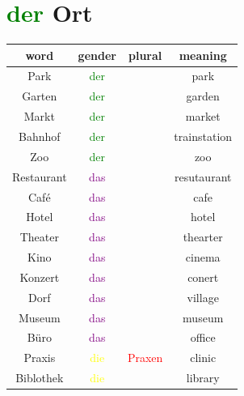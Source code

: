 \section{\textcolor{green}{der} Ort}
\begin{center}
    \begin{tabular}{|c|c|c|c|}
        \hline
        \rowcolor{gray}
        word         & gender                  & plural                  & meaning      \\
        \hline
        Park         & \textcolor{green}{der}  &                         & park         \\
        Garten       & \textcolor{green}{der}  &                         & garden       \\
        Markt        & \textcolor{green}{der}  &                         & market       \\
        Bahnhof      & \textcolor{green}{der}  &                         & trainstation \\
        Zoo          & \textcolor{green}{der}  &                         & zoo          \\
        \hline
        Restaurant   & \textcolor{purple}{das} &                         & resutaurant  \\
        Café         & \textcolor{purple}{das} &                         & cafe         \\
        Hotel        & \textcolor{purple}{das} &                         & hotel        \\
        Theater      & \textcolor{purple}{das} &                         & thearter     \\
        Kino         & \textcolor{purple}{das} &                         & cinema       \\
        Konzert      & \textcolor{purple}{das} &                         & conert       \\
        Dorf         & \textcolor{purple}{das} &                         & village      \\
        Museum       & \textcolor{purple}{das} &                         & museum       \\
        Büro         & \textcolor{purple}{das} &                         & office       \\
        \hline
        Praxis       & \textcolor{yellow}{die} & \textcolor{red}{Praxen} & clinic       \\
        Biblothek    & \textcolor{yellow}{die} &                         & library      \\

\end{tabular}
\end{center}
